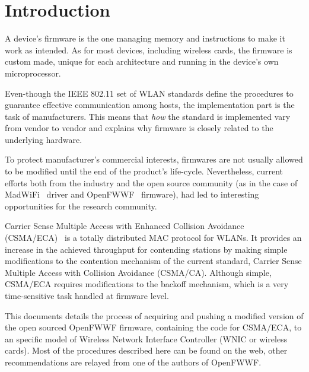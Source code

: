 \documentclass[conference]{IEEEtran}
\begin{document}

\section{Introduction}\label{introduction}
A device's firmware is the one managing memory and instructions to make it work as intended. As for most devices, including wireless cards, the firmware is custom made, unique for each architecture and running in the device's own microprocessor.

Even-though the IEEE 802.11 set of WLAN standards define the procedures to guarantee effective communication among hosts, the implementation part is the task of manufacturers. This means that \emph{how} the standard is implemented vary from vendor to vendor and explains why firmware is closely related to the underlying hardware.


To protect manufacturer's commercial interests, firmwares are not usually allowed to be modified until the end of the product's life-cycle. Nevertheless, current efforts both from the industry and the open source community (as in the case of MadWiFi~\cite{madWiFi} driver and OpenFWWF~\cite{OpenFWWF,WMP} firmware), had led to interesting opportunities for the research community.

Carrier Sense Multiple Access with Enhanced Collision Avoidance (CSMA/ECA)~\cite{barcelo2008lba} is a totally distributed MAC protocol for WLANs. It provides an increase in the achieved throughput for contending stations by making simple modifications to the contention mechanism of the current standard, Carrier Sense Multiple Access with Collision Avoidance (CSMA/CA). Although simple, CSMA/ECA requires modifications to the backoff mechanism, which is a very time-sensitive task handled at firmware level.

This documents details the process of acquiring and pushing a modified version of the open sourced OpenFWWF firmware, containing the code for CSMA/ECA, to an specific model of Wireless Network Interface Controller (WNIC or wireless cards). Most of the procedures described here can be found on the web, other recommendations are relayed from one of the authors of OpenFWWF.

\end{document}

